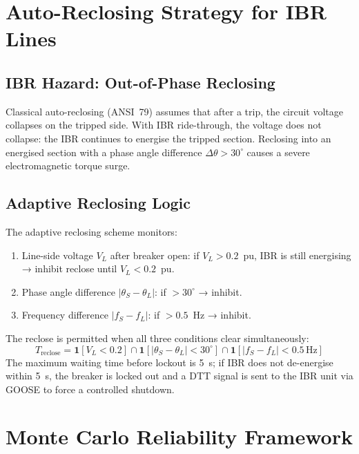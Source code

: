 \section{Auto-Reclosing Strategy for IBR Lines}
\label{sec:ch5_autoreclosing}

\subsection{IBR Hazard: Out-of-Phase Reclosing}

Classical auto-reclosing (ANSI~79) assumes that after a trip, the circuit
voltage collapses on the tripped side. With IBR ride-through, the voltage
does not collapse: the IBR continues to energise the tripped section.
Reclosing into an energised section with a phase angle difference
$\Delta\theta > 30^\circ{}$ causes a severe electromagnetic torque surge.

\subsection{Adaptive Reclosing Logic}

The adaptive reclosing scheme monitors:
\begin{enumerate}
\item Line-side voltage $V_L$ after breaker open: if $V_L > 0.2$~pu, IBR
      is still energising → inhibit reclose until $V_L < 0.2$~pu.
\item Phase angle difference $|\theta_S - \theta_L|$: if $> 30^\circ{}$ → inhibit.
\item Frequency difference $|f_S - f_L|$: if $> 0.5$~Hz → inhibit.
\end{enumerate}
The reclose is permitted when all three conditions clear simultaneously:
\begin{equation}
  T_\mathrm{reclose} = \mathbf{1}\!\left[V_L < 0.2\right]
    \cap \mathbf{1}\!\left[|\theta_S - \theta_L| < 30^\circ{}\right]
    \cap \mathbf{1}\!\left[|f_S - f_L| < 0.5\,\mathrm{Hz}\right]
  \label{eq:ch5_reclose}
\end{equation}
The maximum waiting time before lockout is 5~s; if IBR does not
de-energise within 5~s, the breaker is locked out and a DTT signal is
sent to the IBR unit via GOOSE to force a controlled shutdown.

\section{Monte Carlo Reliability Framework}
\label{sec:ch5_reliability}

